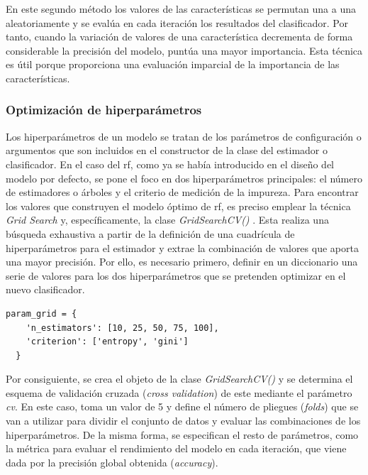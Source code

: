 En este segundo método los valores de las características se permutan una a una aleatoriamente y se evalúa en cada iteración los resultados del clasificador. Por tanto, cuando la variación de valores de una característica decrementa de forma considerable la precisión del modelo, puntúa una mayor importancia. Esta técnica es útil porque proporciona una evaluación imparcial de la importancia de las características. 

\subsubsection{Optimización de hiperparámetros}
\label{rf2}

Los hiperparámetros de un modelo se tratan de los parámetros de configuración o argumentos que son incluidos en el constructor de la clase del estimador o clasificador. En el caso del \gls{rf}, como ya se había introducido en el diseño del modelo por defecto, se pone el foco en dos hiperparámetros principales: el número de estimadores o árboles y el criterio de medición de la impureza. Para encontrar los valores que construyen el modelo óptimo de \gls{rf}, es preciso emplear la técnica \textit{Grid Search} \cite{gridsearch} y, específicamente, la clase \textit{GridSearchCV()} \cite{gridsearch2}. Esta realiza una búsqueda exhaustiva a partir de la definición de una cuadrícula de hiperparámetros para el estimador y extrae la combinación de valores que aporta una mayor precisión. Por ello, es necesario primero, definir en un diccionario una serie de valores para los dos hiperparámetros que se pretenden optimizar en el nuevo clasificador.

\vspace{3mm}

\begin{lstlisting}[style=Python, caption={Cuadrícula de parámetros RF}]
  param_grid = {
    'n_estimators': [10, 25, 50, 75, 100],
    'criterion': ['entropy', 'gini']
  }
\end{lstlisting}

\vspace{3mm}

Por consiguiente, se crea el objeto de la clase \textit{GridSearchCV()} y se determina el esquema de validación cruzada (\textit{cross validation}) de este mediante el parámetro \textit{cv}. En este caso, toma un valor de 5 y define el número de pliegues (\textit{folds}) que se van a utilizar para dividir el conjunto de datos y evaluar las combinaciones de los hiperparámetros. De la misma forma, se especifican el resto de parámetros, como la métrica para evaluar el rendimiento del modelo en cada iteración, que viene dada por la precisión global obtenida (\textit{accuracy}). 

